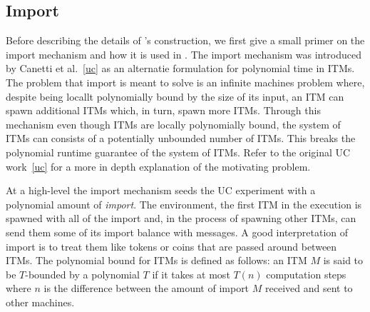 %

%



\subsection{Import}
Before describing the details of \Wasync's construction, we first give a small primer on the import mechanism and how it is used in \Wasync.
The import mechanism was introduced by Canetti et al.~\ref{uc} as an alternatie formulation for polynomial time in ITMs.
The problem that import is meant to solve is an infinite machines problem where, despite being locallt polynomially bound by the size of its input, an ITM can spawn additional ITMs which, in turn, spawn more ITMs.
Through this mechanism even though ITMs are locally polynomially bound, the system of ITMs can consists of a potentially unbounded number of ITMs. 
This breaks the polynomial runtime guarantee of the system of ITMs. 
Refer to the original UC work~\ref{uc} for a more in depth explanation of the motivating problem.

At a high-level the import mechanism seeds the UC experiment with a polynomial amount of \textit{import}.
The environment, the first ITM in the execution is spawned with all of the import and, in the process of spawning other ITMs, can send them some of its import balance with messages.
A good interpretation of import is to treat them like tokens or coins that are passed around between ITMs.
The polynomial bound for ITMs is defined as follows: an ITM $M$ is said to be $T$-bounded by a polynomial $T$ if it takes at most $T(n)$ computation steps where $n$ is the difference between the amount of import $M$ received and sent to other machines.

